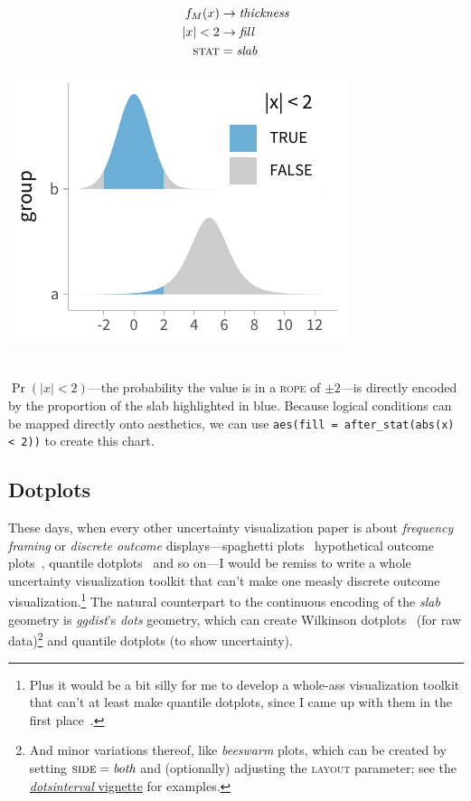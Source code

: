 \documentclass[journal]{vgtc}                     %
\newcommand{\equationfigure}[2]{%
\noindent
\begin{minipage}{.5\columnwidth}
\setlength{\abovedisplayskip}{0pt}
\setlength{\belowdisplayskip}{0pt}
#1\end{minipage}%
\begin{minipage}{.4\columnwidth}\centering #2 \end{minipage}%
\vspace{.5\belowdisplayskip}\\
}
\begin{document}
\equationfigure{
\begin{align*}
f_M(x) &\rightarrow \textit{thickness}\\
\lvert x \rvert < 2 &\rightarrow \textit{fill}\\
\textsc{stat} &= \mathit{slab}
\end{align*}
}{\includegraphics[width=1.2\columnwidth]{figs/3-slab_rope.pdf}}
$\Pr(\lvert x \rvert < 2)$---the probability the value is in a \textsc{rope} of $\pm2$---is directly encoded by the proportion of the slab highlighted in blue. Because logical conditions can be mapped directly onto aesthetics, we can use \texttt{aes(fill = after\_stat(abs(x) < 2))} to create this chart.

\subsection{Dotplots}
\label{sec:dotplots}

These days, when every other uncertainty visualization paper is about \textit{frequency framing} or \textit{discrete outcome} displays---spaghetti plots~\cite{cox2013visualizing,liu2018visualizing} hypothetical outcome plots~\cite{hullman2015hypothetical,kale2018hypothetical}, quantile dotplots~\cite{kay2016ish,fernandes2018uncertainty} and so on---I would be remiss to write a whole uncertainty visualization toolkit that can't make one measly discrete outcome visualization.\footnote{Plus it would be a bit silly for me to develop a whole-ass visualization toolkit that can't at least make quantile dotplots, since I came up with them in the first place~\cite{kay2016ish}.} The natural counterpart to the continuous encoding of the \textit{slab} geometry is \textit{ggdist}'s \textit{dots} geometry, which can create Wilkinson dotplots~\cite{wilkinson1999dot} (for raw data)\footnote{And minor variations thereof, like \textit{beeswarm} plots, which can be created by setting $\textsc{side} = \textit{both}$ and (optionally) adjusting the \textsc{layout} parameter; see the \href{https://mjskay.github.io/ggdist/articles/dotsinterval.html}{\textit{dotsinterval} vignette} for examples.} and quantile dotplots (to show uncertainty).
\end{document}
